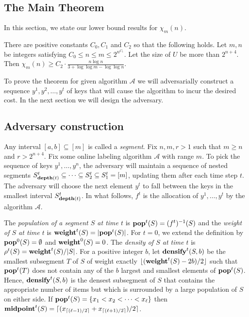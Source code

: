 \documentclass[runningheads,a4paper]{llncs}
\newcommand{\A}{\mathcal{A}}
\newcommand{\thmA}{{C_0}}
\newcommand{\thmB}{{C_1}}
\newcommand{\thmC}{{C_2}}
\newcommand{\pop}{{\rm {\bf pop}}}
\newcommand{\weight}{{\rm {\bf weight}}}
\newcommand{\midp}{{\rm {\bf midpoint}}}
\newcommand{\depth}{{\rm {\bf depth}}}
\newcommand{\densify}{{\rm {\bf densify}}}
\begin{document}
\subsection{The Main Theorem}
\label{subsec:main theorem}
In this section, we state our lower bound results for  $\chi_m(n)$.   

\begin{theorem}
\label{thm:main}
There are positive constants $\thmA, \thmB$ and $\thmC$ so that the following holds. Let $m,n$ be integers satisfying
$\thmA \leq n \le m \le 2^{n^\thmB}$. Let the size of $U$ be more than $2^{n+4}$. 
Then $\chi_m(n) \geq \thmC \cdot \frac{n \log n}{3 + \log \log m - \log \log n}$.
\end{theorem}


To prove the theorem for given algorithm $\A$ we will adversarially construct a sequence $y^1,y^2,\dots,y^t$ of keys that will cause
the algorithm to incur the desired cost. In the next section we will design the adversary.

\subsection{Adversary construction}

Any interval $[a,b]\subseteq [m]$ is called a \emph{segment}. Fix $n,m,r>1$ such that $m\ge n$ and $r>2^{n+4}$.
Fix some online labeling algorithm $\A$ with range $m$. 
To pick the sequence of keys $y^1,\dots,y^n$, the adversary will maintain a sequence of 
nested segments $S^t_{\depth(t)} \subseteq \cdots \subseteq S^t_2 \subseteq S^t_1 = [m]$, updating them after each time step $t$. 
The adversary will choose the next element $y^{t}$ to fall between the keys in
the smallest interval $S^t_{\depth(t)}$. In what follows, $f^t$ is the allocation of $y^1,\dots,y^t$ by the algorithm $\A$.

The \emph{population of a segment $S$ at time $t$} is $\pop^t(S) = (f^t)^{-1}(S)$ and the 
\emph{weight of $S$ at time $t$} is $\weight^t(S) = |\pop^t(S)|$. 
For $t=0$, we extend the definition by $\pop^0(S) = \emptyset$ and $\weight^0(S) = 0$.  
The \emph{density of $S$ at time $t$} is $\rho^t(S) = \weight^t(S) / |S|$. For a positive 
integer $b$, let $\densify^t(S,b)$ be the smallest subsegment $T$ of $S$ of weight exactly 
$\lfloor (\weight^t(S) - 2b) / 2 \rfloor$ such that $\pop^t(T)$ does not contain any of the $b$ largest 
and smallest elements of $\pop^t(S)$. Hence, $\densify^t(S,b)$ is the densest subsegment of $S$ that contains 
the appropriate number of items but which is surrounded by a large population of $S$ on either side.
If $\pop^t(S)=\{x_1<x_2 <\cdots <x_\ell\}$ then $\midp^t(S)= \lceil (x_{\lceil (\ell-1)/2 \rceil} + x_{\lceil (\ell+1)/2 \rceil} )/ 2 \rceil$.
\end{document}
